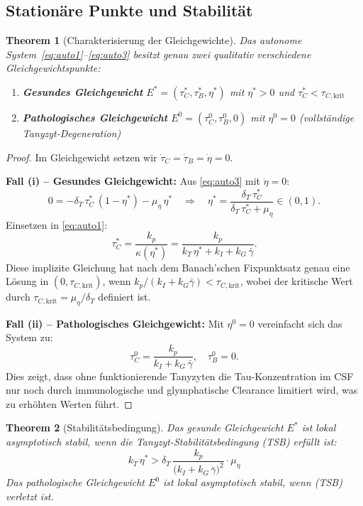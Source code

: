 ﻿\documentclass[12pt,a4paper]{article}
\newtheorem{theorem}{Theorem}[section]
\theoremstyle{definition}
\begin{document}
	\subsection{Stationäre Punkte und Stabilität}
	
	\begin{theorem}[Charakterisierung der Gleichgewichte]
		\label{thm:equilibria}
		Das autonome System~\eqref{eq:auto1}--\eqref{eq:auto3} besitzt genau zwei qualitativ verschiedene Gleichgewichtspunkte:
		
		\begin{enumerate}[label=(\roman*)]
			\item \textbf{Gesundes Gleichgewicht} $E^* = (\tau_C^*, \tau_B^*, \eta^*)$ mit $\eta^* > 0$ und $\tau_C^* < \tau_{C,\text{krit}}$
			\item \textbf{Pathologisches Gleichgewicht} $E^0 = (\tau_C^0, \tau_B^0, 0)$ mit $\eta^0 = 0$ (vollständige Tanyzyt-Degeneration)
		\end{enumerate}
	\end{theorem}
	
	\begin{proof}
		Im Gleichgewicht setzen wir $\dot{\tau}_C = \dot{\tau}_B = \dot{\eta} = 0$.
		
		\textbf{Fall (i) -- Gesundes Gleichgewicht:} Aus \eqref{eq:auto3} mit $\dot{\eta} = 0$:
		\[
		0 = -\delta_T\,\tau_C^*\,(1-\eta^*) - \mu_\eta\,\eta^*
		\quad\Rightarrow\quad
		\eta^* = \frac{\delta_T\,\tau_C^*}{\delta_T\,\tau_C^* + \mu_\eta} \in (0,1).
		\]
		Einsetzen in \eqref{eq:auto1}:
		\[
		\tau_C^* = \frac{k_p}{\kappa(\eta^*)} = \frac{k_p}{k_T\,\eta^* + k_I + k_G\,\bar{\gamma}}.
		\]
		Diese implizite Gleichung hat nach dem Banach'schen Fixpunktsatz genau eine Lösung in $(0, \tau_{C,\text{krit}})$, wenn $k_p / (k_I + k_G\bar{\gamma}) < \tau_{C,\text{krit}}$, wobei der kritische Wert durch $\tau_{C,\text{krit}} = \mu_\eta / \delta_T$ definiert ist.
		
		\textbf{Fall (ii) -- Pathologisches Gleichgewicht:} Mit $\eta^0 = 0$ vereinfacht sich das System zu:
		\[
		\tau_C^0 = \frac{k_p}{k_I + k_G\,\bar{\gamma}}, \quad \tau_B^0 = 0.
		\]
		Dies zeigt, dass ohne funktionierende Tanyzyten die Tau-Konzentration im CSF nur noch durch immunologische und glymphatische Clearance limitiert wird, was zu erhöhten Werten führt.
	\end{proof}
	
	\begin{theorem}[Stabilitätsbedingung]
		\label{thm:stability}
		Das gesunde Gleichgewicht $E^*$ ist lokal asymptotisch stabil, wenn die \emph{Tanyzyt-Stabilitätsbedingung} (TSB) erfüllt ist:
		\begin{equation}
			\boxed{k_T\,\eta^* > \delta_T\,\frac{k_p}{\bigl(k_I + k_G\,\bar{\gamma}\bigr)^2} \cdot \mu_\eta}
			\tag{TSB}
		\end{equation}
		Das pathologische Gleichgewicht $E^0$ ist lokal asymptotisch stabil, wenn (TSB) verletzt ist.
	\end{theorem}
	
\end{document}
